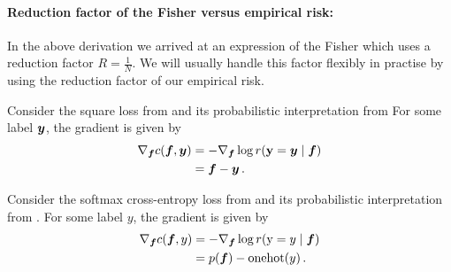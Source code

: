 \paragraph{Reduction factor of the Fisher versus empirical risk:}
In the above derivation we arrived at an expression of the Fisher which uses a reduction factor $R = \frac{1}{N}$.
We will usually handle this factor flexibly in practise by using the reduction factor of our empirical risk.


\begin{example}
  Consider the square loss from  and its probabilistic interpretation from 
  For some label ${\bm{y}}$, the gradient is given by
  \begin{align*}
    \nabla_{{\bm{f}}} c({\bm{f}}, {\bm{y}})
     & =
    - \nabla_{{\bm{f}}} \log r({\mathbf{y}} ={\bm{y}} \mid {\bm{f}})
    \\
     & =
    {\bm{f}} - {\bm{y}}\,.
  \end{align*}
\end{example}

\begin{example}
  Consider the softmax cross-entropy loss from  and its probabilistic interpretation from . For some label $y$, the gradient is given by
  \begin{align*}
    \nabla_{{\bm{f}}} c({\bm{f}}, y)
     & =
    - \nabla_{{\bm{f}}} \log r({\textnormal{y}} = y \mid {\bm{f}})
    \\
     & =
    p({\bm{f}}) - \mathrm{onehot}(y)\,.
  \end{align*}
\end{example}

